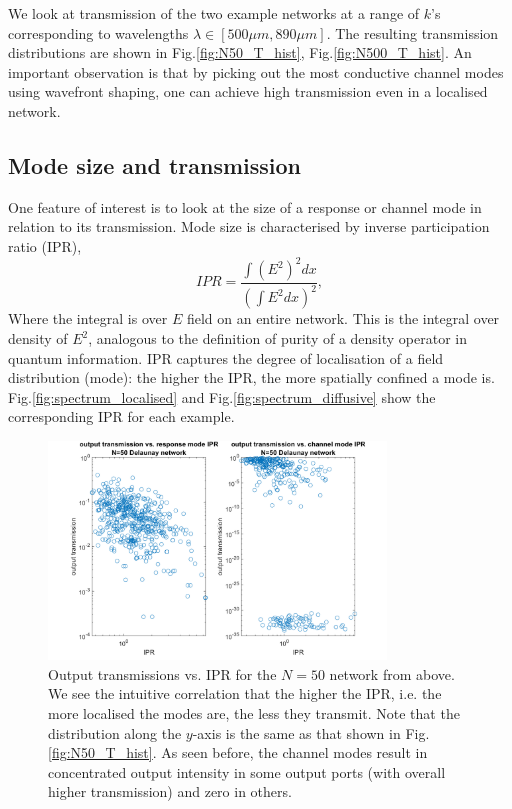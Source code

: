 We look at transmission of the two example networks at a range of $k$'s corresponding to wavelengths $\lambda \in[ 500\mu m , 890 \mu m]$. The resulting transmission distributions are shown in Fig.\ref{fig:N50_T_hist}, Fig.\ref{fig:N500_T_hist}. An important observation is that by picking out the most conductive channel modes using wavefront shaping, one can achieve high transmission even in a localised network.

\subsection{Mode size and transmission}
One feature of interest is to look at the size of a response or channel mode in relation to its transmission. Mode size is characterised by inverse participation ratio (IPR), 
\begin{equation}
    \label{eq:IPR}
    IPR = \frac{\int (E^2)^2 dx}{(\int E^2 dx)^2},
\end{equation}
Where the integral is over $E$ field on an entire network. This is the integral over density of $E^2$, analogous to the definition of purity of a density operator in quantum information. IPR captures the degree of localisation of a field distribution (mode): the higher the IPR, the more spatially confined a mode is. Fig.\ref{fig:spectrum_localised} and Fig.\ref{fig:spectrum_diffusive} show the corresponding IPR for each example.

\begin{figure}[htp]
  \centering
    \includegraphics[width=0.8\textwidth]{ch3/fig3/IPRvsT_N50dexample.png}
    \caption{Output transmissions vs. IPR for the $N=50$ network from above. We see the intuitive correlation that the higher the IPR, i.e. the more localised the modes are, the less they transmit. Note that the distribution along the $y$-axis is the same as that shown in Fig.\ref{fig:N50_T_hist}. As seen before, the channel modes result in concentrated output intensity in some output ports (with overall higher transmission) and zero in others.} 
    \label{fig:IPRvsT_N50}
\end{figure}

